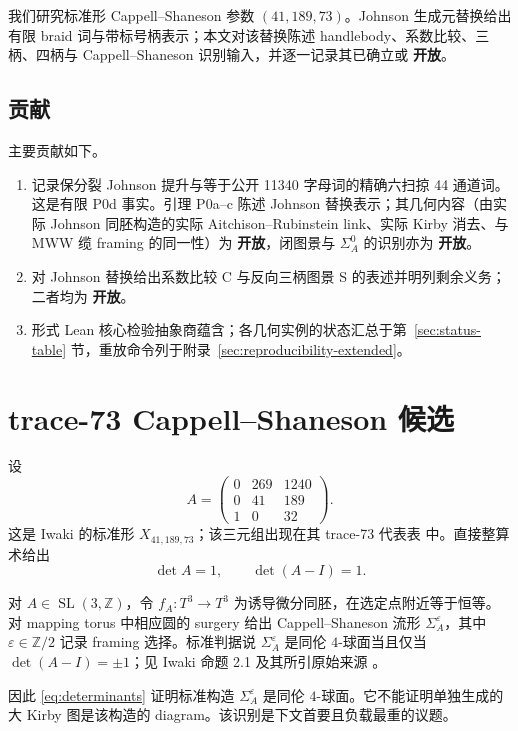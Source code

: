 \documentclass[11pt]{amsart}
\theoremstyle{definition}
\theoremstyle{remark}
\newcommand{\Z}{\mathbb{Z}}
\newcommand{\Open}{\textbf{开放}}
\begin{document}
我们研究标准形 Cappell--Shaneson 参数 $(41,189,73)$。Johnson 生成元替换给出有限 braid 词与带标号柄表示；本文对该替换陈述 handlebody、系数比较、三柄、四柄与 Cappell--Shaneson 识别输入，并逐一记录其已确立或 \Open。

\subsection*{贡献}

主要贡献如下。
\begin{enumerate}
\item 记录保分裂 Johnson 提升与等于公开 11340 字母词的精确六扫掠 44 通道词。这是有限 P0d 事实。引理 P0a--c 陈述 Johnson 替换表示；其几何内容（由实际 Johnson 同胚构造的实际 Aitchison--Rubinstein link、实际 Kirby 消去、与 MWW 缆 framing 的同一性）为 \Open，闭图景与 \(\Sigma_A^0\) 的识别亦为 \Open。
\item 对 Johnson 替换给出系数比较 C 与反向三柄图景 S 的表述并明列剩余义务；二者均为 \Open。
\item 形式 Lean 核心检验抽象商蕴含；各几何实例的状态汇总于第~\ref{sec:status-table} 节，重放命令列于附录~\ref{sec:reproducibility-extended}。
\end{enumerate}
\section{trace-73 Cappell--Shaneson 候选}

设
\begin{equation}\label{eq:A}
A=\begin{pmatrix}
0&269&1240\\
0&41&189\\
1&0&32
\end{pmatrix}.
\end{equation}
这是 Iwaki 的标准形 $X_{41,189,73}$；该三元组出现在其 trace-73 代表表 \cite[Table 2]{Iwaki2024} 中。直接整算术给出
\begin{equation}\label{eq:determinants}
\det A=1,\qquad \det(A-I)=1.
\end{equation}

对 $A\in \operatorname{SL}(3,\Z)$，令 $f_A:T^3\to T^3$ 为诱导微分同胚，在选定点附近等于恒等。对 mapping torus 中相应圆的 surgery 给出 Cappell--Shaneson 流形 $\Sigma_A^\varepsilon$，其中 $\varepsilon\in\Z/2$ 记录 framing 选择。标准判据说 $\Sigma_A^\varepsilon$ 是同伦 $4$-球面当且仅当 $\det(A-I)=\pm1$；见 Iwaki 命题 2.1 及其所引原始来源 \cite{Iwaki2024,CappellShaneson1976}。

因此 \eqref{eq:determinants} 证明标准构造 $\Sigma_A^\varepsilon$ 是同伦 $4$-球面。它不能证明单独生成的大 Kirby 图是该构造的 diagram。该识别是下文首要且负载最重的议题。
\end{document}
